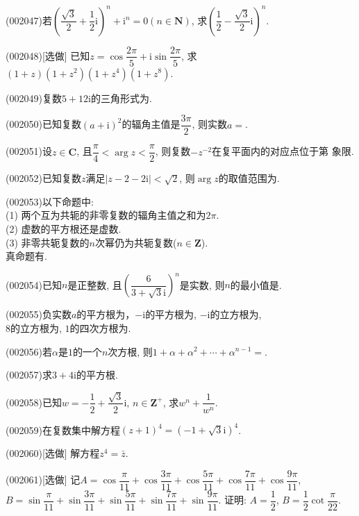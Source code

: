 \item (002047)若$\left(\dfrac{\sqrt{3}}{2}+\dfrac{1}{2}\mathrm{i}\right)^n+\mathrm{i}^n=0(n\in \mathbf{N})$, 求$\left(\dfrac{1}{2}-\dfrac{\sqrt{3}}{2}\mathrm{i}\right)^n$.
\item (002048)[选做]
已知$z=\cos\dfrac{2\pi}{5}+\mathrm{i} \sin \dfrac{2\pi}{5}$, 求$(1+z)(1+z^2)(1+z^4)(1+z^8)$.
\item (002049)复数$5+12\mathrm{i}$的三角形式为.
\item (002050)已知复数$(a+\mathrm{i})^2$的辐角主值是$\dfrac{3\pi}{2}$, 则实数$a=$.
\item (002051)设$z\in \mathbf{C}$, 且$\dfrac{\pi}{4}<\arg z<\dfrac{\pi}{2}$, 则复数$-z^{-2}$在复平面内的对应点位于第 象限.
\item (002052)已知复数$z$满足$|z-2-2\mathrm{i}|<\sqrt{2}$, 则$\arg z$的取值范围为.
\item (002053)以下命题中:\\ 
(1) 两个互为共轭的非零复数的辐角主值之和为$2\pi$.\\ 
(2) 虚数的平方根还是虚数.\\ 
(3) 非零共轭复数的$n$次幂仍为共轭复数($n\in \mathbf{Z}$).\\ 
真命题有.
\item (002054)已知$n$是正整数, 且$\left(\dfrac{6}{3+\sqrt{3}\mathrm{i}}\right)^n$是实数, 则$n$的最小值是.
\item (002055)负实数$a$的平方根为，$-\mathrm{i}$的平方根为, $-\mathrm{i}$的立方根为,\\ 
$8$的立方根为, $1$的四次方根为.
\item (002056)若$\alpha$是$1$的一个$n$次方根, 则$1+\alpha+\alpha^2+\cdots+\alpha^{n-1}=$.
\item (002057)求$3+4\mathrm{i}$的平方根.
\item (002058)已知$w=-\dfrac{1}{2}+\dfrac{\sqrt{3}}{2}\mathrm{i}$, $n\in \mathbf{Z}^+$, 求$w^n+\dfrac{1}{w^n}$.
\item (002059)在复数集中解方程$(z+1)^4=(-1+\sqrt{3}\mathrm{i})^4$.
\item (002060)[选做]
解方程$z^4=\bar{z}$.
\item (002061)[选做]
记$A=\cos\dfrac{\pi}{11}+\cos\dfrac{3\pi}{11}+\cos\dfrac{5\pi}{11}+\cos\dfrac{7\pi}{11}+\cos\dfrac{9\pi}{11}$, $B=\sin\dfrac{\pi}{11}+\sin\dfrac{3\pi}{11}+\sin\dfrac{5\pi}{11}+\sin\dfrac{7\pi}{11}+\sin\dfrac{9\pi}{11}$. 证明: $A=\dfrac{1}{2}$, $B=\dfrac{1}{2}\cot\dfrac{\pi}{22}$.
